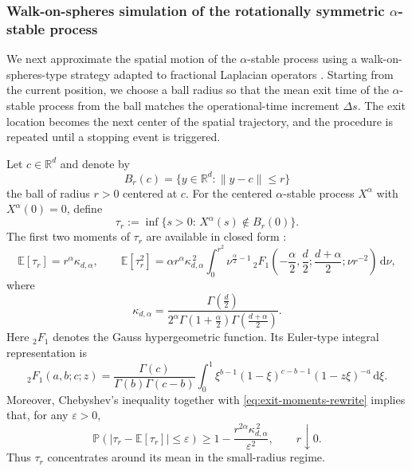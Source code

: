 \documentclass[a4paper,fleqn]{cas-sc}
\begin{document}
\subsubsection{Walk-on-spheres simulation of the rotationally symmetric $\alpha$-stable process}

We next approximate the spatial motion of the $\alpha$-stable process using a
walk-on-spheres-type strategy adapted to fractional Laplacian operators
\cite{KyprianouOsojnikShardlow2017UnbiasedWoS,ShengSuXu2023EfficientMCIFL}.
Starting from the current position, we choose a ball radius so that the mean
exit time of the $\alpha$-stable process from the ball matches the
operational-time increment $\Delta s$. The exit location becomes the next
center of the spatial trajectory, and the procedure is repeated until a
stopping event is triggered.

Let $c\in\mathbb{R}^d$ and denote by
\[
B_r(c)=\{y\in\mathbb{R}^d:\|y-c\|\le r\}
\]
the ball of radius $r>0$ centered at $c$. For the centered $\alpha$-stable
process $X^\alpha$ with $X^\alpha(0)=0$, define
\begin{equation}\label{eq:first-exit-rewrite}
\tau_r
:=
\inf\{s>0:\,X^\alpha(s)\notin B_r(0)\}.
\end{equation}
The first two moments of $\tau_r$ are available in closed form
\cite{getoor1961first}:
\begin{equation}\label{eq:exit-moments-rewrite}
\mathbb{E}[\tau_r]=r^\alpha \kappa_{d,\alpha},
\qquad
\mathbb{E}[\tau_r^2]
=
\alpha r^\alpha \kappa_{d,\alpha}^{\,2}
\int_{0}^{r^2}
\nu^{\frac{\alpha}{2}-1}\,
{}_2F_1\!\left(
-\frac{\alpha}{2},\frac{d}{2};
\frac{d+\alpha}{2};
\nu r^{-2}
\right)\,\mathrm{d}\nu,
\end{equation}
where
\[
\kappa_{d,\alpha}
=
\frac{\Gamma(\frac{d}{2})}
{2^\alpha\Gamma(1+\frac{\alpha}{2})\Gamma(\frac{d+\alpha}{2})}.
\]
Here ${}_2F_1$ denotes the Gauss hypergeometric function. Its Euler-type
integral representation is
\begin{equation}\label{eq:2F1-def-rewrite}
{}_2F_1(a,b;c;z)
=
\frac{\Gamma(c)}{\Gamma(b)\Gamma(c-b)}
\int_0^1
\xi^{b-1}(1-\xi)^{c-b-1}(1-z\xi)^{-a}\,\mathrm{d}\xi .
\end{equation}
Moreover, Chebyshev's inequality together with
\eqref{eq:exit-moments-rewrite} implies that, for any $\varepsilon>0$,
\begin{equation}\label{eq:exit-prob-rewrite}
\mathbb{P}\!\left(
\big|\tau_r-\mathbb{E}[\tau_r]\big|\le \varepsilon
\right)
\ge
1-\frac{r^{2\alpha}\kappa_{d,\alpha}^{\,2}}{\varepsilon^2},
\qquad r\downarrow0.
\end{equation}
Thus $\tau_r$ concentrates around its mean in the small-radius regime.
\end{document}
